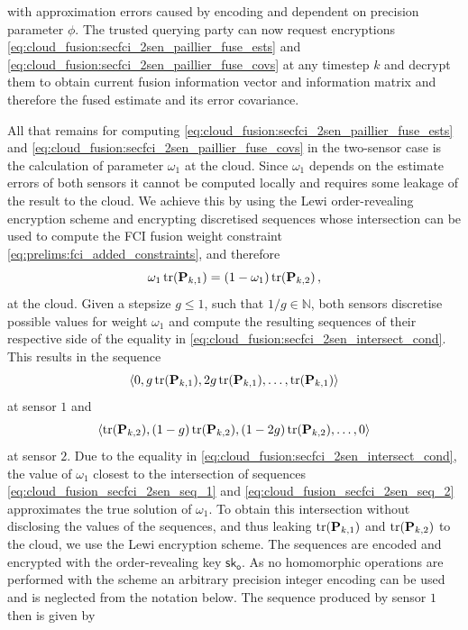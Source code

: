 with approximation errors caused by encoding and dependent on precision parameter $\phi$. The trusted querying party can now request encryptions \eqref{eq:cloud_fusion:secfci_2sen_paillier_fuse_ests} and \eqref{eq:cloud_fusion:secfci_2sen_paillier_fuse_covs} at any timestep $k$ and decrypt them to obtain current fusion information vector and information matrix and therefore the fused estimate and its error covariance.

All that remains for computing \eqref{eq:cloud_fusion:secfci_2sen_paillier_fuse_ests} and \eqref{eq:cloud_fusion:secfci_2sen_paillier_fuse_covs} in the two-sensor case is the calculation of parameter $\omega_1$ at the cloud. Since $\omega_1$ depends on the estimate errors of both sensors it cannot be computed locally and requires some leakage of the result to the cloud. We achieve this by using the Lewi order-revealing encryption scheme and encrypting discretised sequences whose intersection can be used to compute the FCI fusion weight constraint \eqref{eq:prelims:fci_added_constraints}, and therefore
\begin{equation}\label{eq:cloud_fusion:secfci_2sen_intersect_cond}
    \omega_1\operatorname{tr}({{\mathbf{P}}}_{k,1}) = (1-\omega_1)\operatorname{tr}({{\mathbf{P}}}_{k,2})\,,
\end{equation}
at the cloud. Given a stepsize $g\leq 1$, such that $1/g \in \mathbb{N}$, both sensors discretise possible values for weight $\omega_1$ and compute the resulting sequences of their respective side of the equality in \eqref{eq:cloud_fusion:secfci_2sen_intersect_cond}. This results in the sequence
\begin{equation}\label{eq:cloud_fusion_secfci_2sen_seq_1}
    \left\langle0, g\operatorname{tr}({{\mathbf{P}}}_{k,1}), 2g\operatorname{tr}({{\mathbf{P}}}_{k,1}),\dots,\operatorname{tr}({{\mathbf{P}}}_{k,1})\right\rangle
\end{equation}
at sensor $1$ and
\begin{equation}\label{eq:cloud_fusion_secfci_2sen_seq_2}
    \left\langle\operatorname{tr}({{\mathbf{P}}}_{k,2}), (1-g)\operatorname{tr}({{\mathbf{P}}}_{k,2}), (1-2g)\operatorname{tr}({{\mathbf{P}}}_{k,2}),\dots,0\right\rangle
\end{equation}
at sensor $2$. Due to the equality in \eqref{eq:cloud_fusion:secfci_2sen_intersect_cond}, the value of $\omega_1$ closest to the intersection of sequences \eqref{eq:cloud_fusion_secfci_2sen_seq_1} and \eqref{eq:cloud_fusion_secfci_2sen_seq_2} approximates the true solution of $\omega_1$. To obtain this intersection without disclosing the values of the sequences, and thus leaking $\operatorname{tr}({{\mathbf{P}}}_{k,1})$ and $\operatorname{tr}({{\mathbf{P}}}_{k,2})$ to the cloud, we use the Lewi encryption scheme. The sequences are encoded and encrypted with the order-revealing key $\mathsf{sk}_{\mathsf{o}}$. As no homomorphic operations are performed with the scheme an arbitrary precision integer encoding can be used and is neglected from the notation below. The sequence produced by sensor $1$ then is given by
